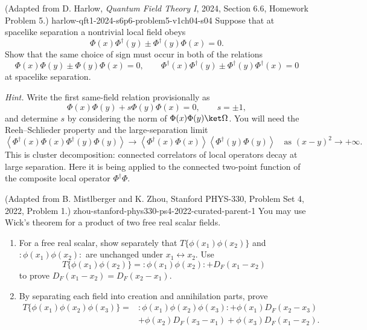 \begin{enumerate}
  {(Adapted from D. Harlow, \emph{Quantum Field Theory I}, 2024, Section 6.6, Homework Problem 5.)}
  {harlow-qft1-2024-s6p6-problem5-v1ch04-s04}
Suppose that at spacelike separation a nontrivial local field obeys
\[
 \Phi(x)\Phi^\dagger(y)
 \mathbin{\pm}\Phi^\dagger(y)\Phi(x)=0.
\]
Show that the same choice of sign must occur in both of the relations
\[
 \Phi(x)\Phi(y)\mathbin{\pm}\Phi(y)\Phi(x)=0,
 \qquad
 \Phi^\dagger(x)\Phi^\dagger(y)
 \mathbin{\pm}\Phi^\dagger(y)\Phi^\dagger(x)=0
\]
at spacelike separation.

\emph{Hint.}  Write the first same-field relation provisionally as
\[
 \Phi(x)\Phi(y)+s\Phi(y)\Phi(x)=0,
 \qquad s=\pm1,
\]
and determine \(s\) by considering the norm of
\(\Phi(x)\Phi(y)\ket\Omega\).  You will need the Reeh--Schlieder
property and the large-separation limit
\[
 \left\langle
 \Phi^\dagger(x)\Phi(x)\Phi^\dagger(y)\Phi(y)
 \right\rangle
 \longrightarrow
 \left\langle\Phi^\dagger(x)\Phi(x)\right\rangle
 \left\langle\Phi^\dagger(y)\Phi(y)\right\rangle
 \quad\text{as }(x-y)^2\to+\infty.
\]
This is cluster decomposition: connected correlators of local operators
decay at large separation.  Here it is being applied to the connected
two-point function of the composite local operator \(\Phi^\dagger\Phi\).

  {(Adapted from B. Mistlberger and K. Zhou, Stanford PHYS-330, Problem Set 4, 2022, Problem 1.)}
  {zhou-stanford-phys330-ps4-2022-curated-parent-1}
You may use Wick's theorem for a product of two free real scalar fields.
\begin{enumerate}
\item
For a free real scalar, show separately that
\(T\{\phi(x_1)\phi(x_2)\}\) and
\(:\!\phi(x_1)\phi(x_2)\!:\) are unchanged under
\(x_1\leftrightarrow x_2\).  Use
\[
 T\{\phi(x_1)\phi(x_2)\}
 =:\!\phi(x_1)\phi(x_2)\!:+D_F(x_1-x_2)
\]
to prove \(D_F(x_1-x_2)=D_F(x_2-x_1)\).
\item
By separating each field into creation and annihilation parts, prove
\[
\begin{split}
T\{\phi(x_1)\phi(x_2)\phi(x_3)\}
={}&:\!\phi(x_1)\phi(x_2)\phi(x_3)\!:
 +\phi(x_1)D_F(x_2-x_3)\\
&+\phi(x_2)D_F(x_3-x_1)
 +\phi(x_3)D_F(x_1-x_2).
\end{split}
\]
\end{enumerate}


\end{enumerate}
